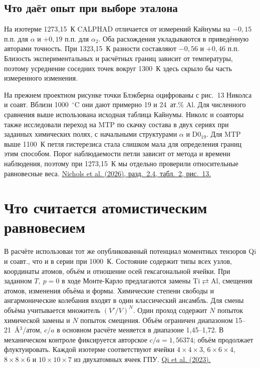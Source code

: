 \documentclass[11pt,a4paper]{article}
\begin{document}
\subsection*{Что даёт опыт при выборе эталона}
На изотерме 1273,15~К CALPHAD отличается от измерений Кайнумы на
\(-0{,}15\) п.п. для \(\alpha\) и \(+0{,}19\) п.п. для \(\alpha_2\).
Оба расхождения укладываются в приведённую авторами точность.
При 1323,15~К разности составляют \(-0{,}56\) и \(+0{,}46\) п.п.
Близость экспериментальных и расчётных границ зависит от температуры,
поэтому усреднение соседних точек вокруг 1300~К здесь скрыло бы часть
измеренного изменения.

На прежнем проектном рисунке точки Блэкберна оцифрованы с
рис.~13 Николса и соавт. Вблизи 1000~\(^\circ\)C они дают примерно
19 и 24~ат.\% Al. Для численного сравнения выше использована исходная
таблица Кайнумы. Николс и соавторы также исследовали переход на MTP
по скачку состава в двух сериях при заданных химических полях,
с начальными структурами \(\alpha\) и D0$_{19}$. Для MTP выше
1100~К петля гистерезиса стала слишком мала для определения границ
этим способом. Порог наблюдаемости петли зависит от метода и времени
наблюдения, поэтому при 1273,15~К мы отдельно проверили относительные
равновесные веса.
\href{https://doi.org/10.3390/met16020140}{Nichols et al. (2026), разд.~2.4, табл.~2, рис.~13.}

\clearpage

\section*{Что считается атомистическим равновесием}
В расчёте использован тот же опубликованный потенциал моментных тензоров
Qi и соавт., что и в серии при 1000~К. Состояние содержит типы всех
узлов, координаты атомов, объём и отношение осей гексагональной ячейки.
При заданном \(T,\ p=0\) в ходе Монте-Карло предлагаются замены
Ti\(\rightleftarrows\)Al, смещения атомов, изменения объёма и формы.
Химические степени свободы и ангармонические колебания входят в один
классический ансамбль. Для смены объёма учитывается множитель
\((V'/V)^N\). Один проход содержит \(N\) попыток химической замены и
\(N\) попыток смещения. Объём ограничен диапазоном 15--21~\AA$^3$/атом,
\(c/a\) в основном расчёте меняется в диапазоне 1,45--1,72.
В механическом контроле фиксируется авторское \(c/a=1{,}56374\);
объём продолжает флуктуировать. Каждой изотерме соответствуют ячейки
\(4\times4\times3\), \(6\times6\times4\), \(8\times8\times6\) и
\(10\times10\times7\) из двухатомных ячеек ГПУ.
\href{https://doi.org/10.1103/PhysRevMaterials.7.103602}{Qi et al. (2023).}
\end{document}
